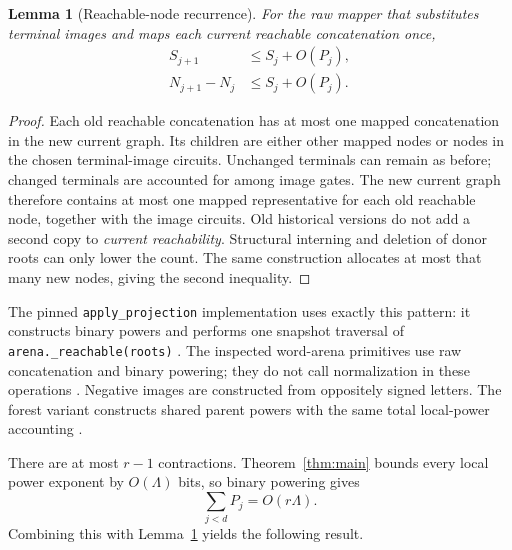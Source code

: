 \documentclass[11pt,letterpaper]{article}
\newtheorem{lemma}[theorem]{Lemma}
\theoremstyle{definition}
\theoremstyle{remark}\newtheorem{remark}[theorem]{Remark}
\newcommand{\code}[1]{\texttt{\small #1}}
\begin{document}
\begin{lemma}[Reachable-node recurrence]
\label{lem:reachable}
For the raw mapper that substitutes terminal images and maps each current
reachable concatenation once,
\begin{align}
 S_{j+1}&\le S_j+O(P_j),\label{eq:reachable}\\
 N_{j+1}-N_j&\le S_j+O(P_j).\label{eq:allocated}
\end{align}
\end{lemma}
\begin{proof}
Each old reachable concatenation has at most one mapped concatenation in the
new current graph. Its children are either other mapped nodes or nodes in the
chosen terminal-image circuits. Unchanged terminals can remain as before;
changed terminals are accounted for among image gates. The new current graph
therefore contains at most one mapped representative for each old reachable
node, together with the image circuits. Old historical versions do not add a
second copy to \emph{current reachability}. Structural interning and deletion
of donor roots can only lower the count. The same construction allocates at
most that many new nodes, giving the second inequality.
\end{proof}

The pinned \code{apply\_projection} implementation uses exactly this pattern:
it constructs binary powers and performs one snapshot traversal of
\code{arena.\_reachable(roots)} \cite{repo-code}. The inspected word-arena
primitives use raw concatenation and binary powering; they do not call
normalization in these operations \cite{repo-arena}. Negative images are
constructed from oppositely signed letters. The forest variant constructs
shared parent powers with the same total local-power accounting
\cite{repo-forest}.

There are at most $r-1$ contractions. Theorem~\ref{thm:main} bounds every local
power exponent by $O(\Lambda)$ bits, so binary powering gives
\[
 \sum_{j<d}P_j=O(r\Lambda).
\]
Combining this with Lemma~\ref{lem:reachable} yields the following result.
\end{document}
